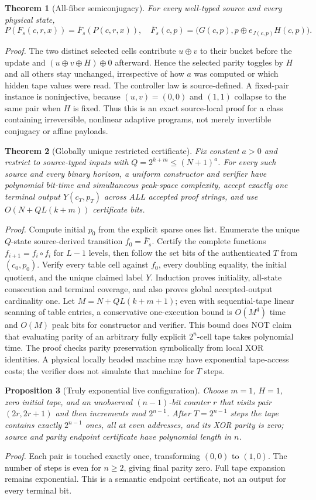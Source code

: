 \documentclass[11pt]{article}
\newtheorem{theorem}{Theorem}
\newtheorem{proposition}[theorem]{Proposition}
\begin{document}
\begin{theorem}[All-fiber semiconjugacy]
For every well-typed source and every physical state,
\[
P(F_s(c,r,x))=\overline F_s(P(c,r,x)),\quad
\overline F_s(c,p)=\bigl(G(c,p),p\oplus e_{J(c,p)}H(c,p)\bigr).
\]
\end{theorem}
\noindent\emph{Proof.} The two distinct selected cells contribute $u\oplus v$ to their bucket before the update and $(u\oplus v\oplus H)\oplus0$ afterward. Hence the selected parity toggles by $H$ and all others stay unchanged, irrespective of how $a$ was computed or which hidden tape values were read. The controller law is source-defined. A fixed-pair instance is noninjective, because $(u,v)=(0,0)$ and $(1,1)$ collapse to the same pair when $H$ is fixed. Thus this is an exact source-local proof for a class containing irreversible, nonlinear adaptive programs, not merely invertible conjugacy or affine payloads.
\begin{theorem}[Globally unique restricted certificate]
Fix constant $a>0$ and restrict to source-typed inputs with $Q=2^{k+m}\le(N+1)^a$. For every such source and every binary horizon, a uniform constructor and verifier have polynomial bit-time and simultaneous peak-space complexity, accept exactly one terminal output $Y(c_T,p_T)$ across ALL accepted proof strings, and use $O(N+QL(k+m))$ certificate bits.
\end{theorem}
\noindent\emph{Proof.} Compute initial $p_0$ from the explicit sparse ones list. Enumerate the unique $Q$-state source-derived transition $f_0=\overline F_s$. Certify the complete functions $f_{i+1}=f_i\circ f_i$ for $L-1$ levels, then follow the set bits of the authenticated $T$ from $(c_0,p_0)$. Verify every table cell against $f_0$, every doubling equality, the initial quotient, and the unique claimed label $Y$. Induction proves initiality, all-state consecution and terminal coverage, and also proves global accepted-output cardinality one. Let $M=N+QL(k+m+1)$; even with sequential-tape linear scanning of table entries, a conservative one-execution bound is $O(M^4)$ time and $O(M)$ peak bits for constructor and verifier. This bound does NOT claim that evaluating parity of an arbitrary fully explicit $2^n$-cell tape takes polynomial time. The proof checks parity preservation symbolically from local XOR identities. A physical locally headed machine may have exponential tape-access costs; the verifier does not simulate that machine for $T$ steps.

\begin{proposition}[Truly exponential live configuration]
Choose $m=1$, $H=1$, zero initial tape, and an unobserved $(n-1)$-bit counter $r$ that visits pair $(2r,2r+1)$ and then increments mod $2^{n-1}$. After $T=2^{n-1}$ steps the tape contains exactly $2^{n-1}$ ones, all at even addresses, and its XOR parity is zero; source and parity endpoint certificate have polynomial length in $n$.
\end{proposition}
\noindent\emph{Proof.} Each pair is touched exactly once, transforming $(0,0)$ to $(1,0)$. The number of steps is even for $n\ge2$, giving final parity zero. Full tape expansion remains exponential. This is a semantic endpoint certificate, not an output for every terminal bit.
\end{document}
